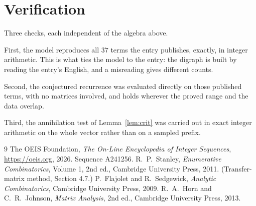 \documentclass[11pt,a4paper]{article}
\theoremstyle{plain}
\theoremstyle{definition}
\begin{document}
\section{Verification}

Three checks, each independent of the algebra above.

First, the model reproduces all $37$ terms the entry publishes, exactly, in integer
arithmetic. This is what ties the model to the entry: the digraph is built by reading the
entry's English, and a misreading gives different counts.

Second, the conjectured recurrence was evaluated directly on those published terms, with no
matrices involved, and holds wherever the proved range and the data overlap.

Third, the annihilation test of Lemma~\ref{lem:crit} was carried out in exact integer
arithmetic on the whole vector rather than on a sampled prefix.

\begin{thebibliography}{9}
 The OEIS Foundation, \emph{The On-Line Encyclopedia of Integer
Sequences}, \url{https://oeis.org}, 2026. Sequence A241256.
 R.~P.~Stanley, \emph{Enumerative Combinatorics}, Volume 1, 2nd ed.,
Cambridge University Press, 2011. (Transfer-matrix method, Section 4.7.)
 P.~Flajolet and R.~Sedgewick, \emph{Analytic Combinatorics}, Cambridge
University Press, 2009.
 R.~A.~Horn and C.~R.~Johnson, \emph{Matrix Analysis}, 2nd ed., Cambridge
University Press, 2013.
\end{thebibliography}
\end{document}
